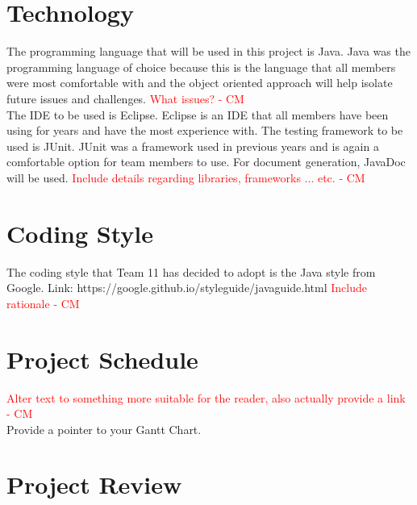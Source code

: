 \documentclass{article}
\begin{document}
\section{Technology}
The programming language that will be used in this project is Java. Java was the programming language of choice because this is the language that all members were most comfortable with and the object oriented approach will help isolate future issues and challenges. \textcolor{red}{What issues? - CM} \\ The IDE to be used is Eclipse. Eclipse is an IDE that all members have been using for  years and have the most experience with. The testing framework to be used is JUnit. JUnit was a framework used in previous years and is again a comfortable option for team members to use. For document generation, JavaDoc will be used.
\textcolor{red}{Include details regarding libraries, frameworks ... etc.  - CM} \\
\section{Coding Style}
The coding style that Team 11 has decided to adopt is the Java style from Google. Link: https://google.github.io/styleguide/javaguide.html
\textcolor{red}{ Include rationale - CM} \\
\section{Project Schedule}
\textcolor{red}{Alter text to something more suitable for the reader, also actually provide a link - CM} \\
Provide a pointer to your Gantt Chart.
\section{Project Review}
\end{document}
